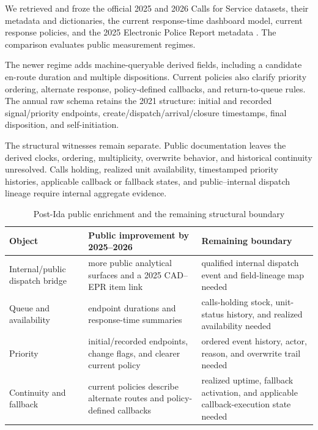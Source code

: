 \documentclass[11pt]{article}
\begin{document}
We retrieved and froze the official 2025 and 2026 Calls for Service datasets, their metadata and dictionaries, the current response-time dashboard model, current response policies, and the 2025 Electronic Police Report metadata \citep{DataNOLA2025,DataNOLA2026,NOPDPolicy2025,NOPDAPR2024,NOPDResponseDashboard2026}. The comparison evaluates public measurement regimes.

The newer regime adds machine-queryable derived fields, including a candidate en-route duration and multiple dispositions. Current policies also clarify priority ordering, alternate response, policy-defined callbacks, and return-to-queue rules. The annual raw schema retains the 2021 structure: initial and recorded signal/priority endpoints, create/dispatch/arrival/closure timestamps, final disposition, and self-initiation.

The structural witnesses remain separate. Public documentation leaves the derived clocks, ordering, multiplicity, overwrite behavior, and historical continuity unresolved. Calls holding, realized unit availability, timestamped priority histories, applicable callback or fallback states, and public--internal dispatch lineage require internal aggregate evidence.

\begin{table}[H]
\centering
\caption{Post-Ida public enrichment and the remaining structural boundary}
\label{tab:m8p}
\begin{tabularx}{\textwidth}{@{}l X X@{}}
\toprule
Object & Public improvement by 2025--2026 & Remaining boundary \\
\midrule
Internal/public dispatch bridge & more public analytical surfaces and a 2025 CAD--EPR item link & qualified internal dispatch event and field-lineage map needed \\
Queue and availability & endpoint durations and response-time summaries & calls-holding stock, unit-status history, and realized availability needed \\
Priority & initial/recorded endpoints, change flags, and clearer current policy & ordered event history, actor, reason, and overwrite trail needed \\
Continuity and fallback & current policies describe alternate routes and policy-defined callbacks & realized uptime, fallback activation, and applicable callback-execution state needed \\
\bottomrule
\end{tabularx}
\end{table}
\end{document}

